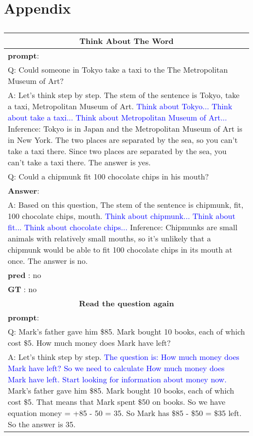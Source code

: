 \documentclass[11pt]{article}
\begin{document}
\section{Appendix}
\label{sec:appendix}
%
\begin{table}[!h]
\small
\caption{}
  \label{wide_table1}
  \begin{tabularx}{\textwidth}{X}
    \toprule
    \multicolumn{1}{c}{\textbf{Think About The Word}} \\\midrule
\textbf{prompt}: \\
Q: Could someone in Tokyo take a taxi to the The Metropolitan Museum of Art?\\
A: Let's think step by step. The stem of the sentence is Tokyo, take a taxi, Metropolitan Museum of Art. \textcolor{blue}{Think about Tokyo... Think about take a taxi... Think about Metropolitan Museum of Art...} Inference: Tokyo is in Japan and the Metropolitan Museum of Art is in New York. The two places are separated by the sea, so you can't take a taxi there. Since two places are separated by the sea, you can't take a taxi there. The answer is yes.  \\

Q: Could a chipmunk fit 100 chocolate chips in his mouth?\\\midrule
\textbf{Answer}:\\
A:
Based on this question, The stem of the sentence is chipmunk, fit, 100 chocolate chips, mouth. \textcolor{blue} {Think about chipmunk... Think about fit... Think about chocolate chips...} Inference: Chipmunks are small animals with relatively small mouths, so it's unlikely that a chipmunk would be able to fit 100 chocolate chips in its mouth at once. The answer is no.\\
\textbf{pred} : no\\
\textbf{GT} : no\\\toprule
    \multicolumn{1}{c}{\textbf{Read the question again}} \\\midrule
\textbf{prompt}: \\
Q: Mark's father gave him \$85. Mark bought 10 books, each of which cost \$5. How much money does Mark have left?\\
A: Let's think step by step. \textcolor{blue} {The question is: How much money does Mark have left? So we need to calculate How much money does Mark have left. Start looking for information about money now.} Mark's father gave him \$85. Mark bought 10 books, each of which cost \$5. That means that Mark spent \$50 on books. So we have equation money = +85 - 50 = 35. So Mark has \$85 - \$50 = \$35 left. So the answer is 35.\\


\end{tabularx}
\end{table}
\end{document}

